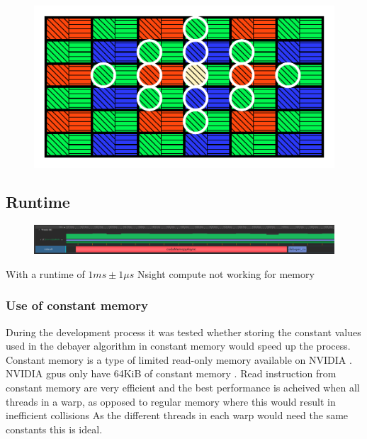 \begin{figure}[H]
    \centering
    \includegraphics[width=\textwidth]{figures/polarized_image/separated_conv.pdf}
\end{figure}


\subsection{Runtime}
\begin{figure}[H]
    \centering
    \includegraphics[width=\textwidth]{figures/memory_comparaison.png}
\end{figure}

With a runtime of $1 ms \pm 1 \mu s$
Nsight compute not working for memory







\subsubsection{Use of constant memory}
During the development process it was tested whether storing the constant values used in the debayer algorithm in constant memory would speed up the process.
Constant memory is a type of limited read-only memory available on NVIDIA  \cite[61]{nvidiaCUDABestPractices2023}.
NVIDIA \glspl{gpu} only have 64KiB of constant memory \cite[61]{nvidiaCUDABestPractices2023}.
Read instruction from constant memory are very efficient and the best performance is acheived when all threads in a warp, as opposed to regular memory where this would result in inefficient collisions \cite[61]{nvidiaCUDABestPractices2023} \cite[13,14]{volkovLatencyHiding2016}
As the different threads in each warp would need the same constants this is ideal.


